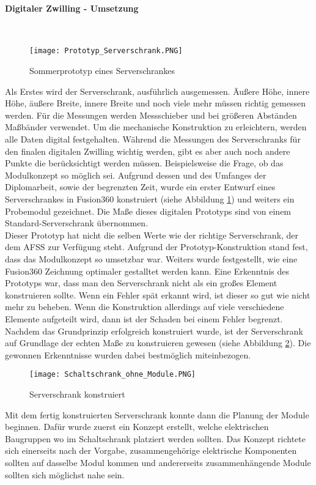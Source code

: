     \paragraph{Digitaler Zwilling - Umsetzung}\mbox{}\\ 

    \begin{figure}[h]
        \centering
        \texttt{[image: Prototyp\_Serverschrank.PNG]}
        \caption{Sommerprototyp eines Serverschrankes}
        \label{fig:Sommerprototyp}
    \end{figure}
    Als Erstes wird der Serverschrank, ausführlich ausgemessen. Äußere Höhe, innere Höhe, äußere Breite, innere Breite und noch viele mehr müssen richtig gemessen werden.    
    Für die Messungen werden Messschieber und bei größeren Abständen Maßbänder verwendet. Um die mechanische Konstruktion zu erleichtern, werden alle Daten digital festgehalten. Während die Messungen des Serverschranks für den finalen digitalen Zwilling wichtig werden, gibt es aber auch noch andere Punkte die berücksichtigt werden müssen. Beispielsweise die Frage, ob das Modulkonzept so möglich sei. Aufgrund dessen und des Umfanges der Diplomarbeit, sowie der begrenzten Zeit, wurde ein erster Entwurf eines Serverschrankes in Fusion360 konstruiert (siehe Abbildung \ref{fig:Sommerprototyp}) und weiters ein Probemodul gezeichnet. Die Maße dieses digitalen Prototyps sind von einem Standard-Serverschrank übernommen.\\
    Dieser Prototyp hat nicht die selben Werte wie der richtige Serverschrank, der dem AFSS zur Verfügung steht. Aufgrund der Prototyp-Konstruktion stand fest, dass das Modulkonzept so umsetzbar war. Weiters wurde festgestellt, wie eine Fusion360 Zeichnung optimaler gestalltet werden kann. Eine Erkenntnis des Prototyps war, dass man den Serverschrank nicht als ein großes Element konstruieren sollte. Wenn ein Fehler spät erkannt wird, ist dieser so gut wie nicht mehr zu beheben. Wenn die Konstruktion allerdings auf viele verschiedene Elemente aufgeteilt wird, dann ist der Schaden bei einem Fehler begrenzt.\\
    Nachdem das Grundprinzip erfolgreich konstruiert wurde, ist der Serverschrank auf Grundlage der echten Maße zu konstruieren gewesen (siehe Abbildung \ref{fig:Clean_Serverschrank}). Die gewonnen Erkenntnisse wurden dabei bestmöglich miteinbezogen.\\    
    \begin{figure}[H]
        \centering
        \texttt{[image: Schaltschrank\_ohne\_Module.PNG]} 
        \caption{Serverschrank konstruiert}
        \label{fig:Clean_Serverschrank}
    \end{figure}
    Mit dem fertig konstruierten Serverschrank konnte dann die Planung der Module beginnen. Dafür wurde zuerst ein Konzept erstellt, welche elektrischen Baugruppen wo im Schaltschrank platziert werden sollten. Das Konzept richtete sich einerseits nach der Vorgabe, zusammengehörige elektrische Komponenten sollten auf dasselbe Modul kommen und andererseits zusammenhängende Module sollten sich möglichst nahe sein. 
